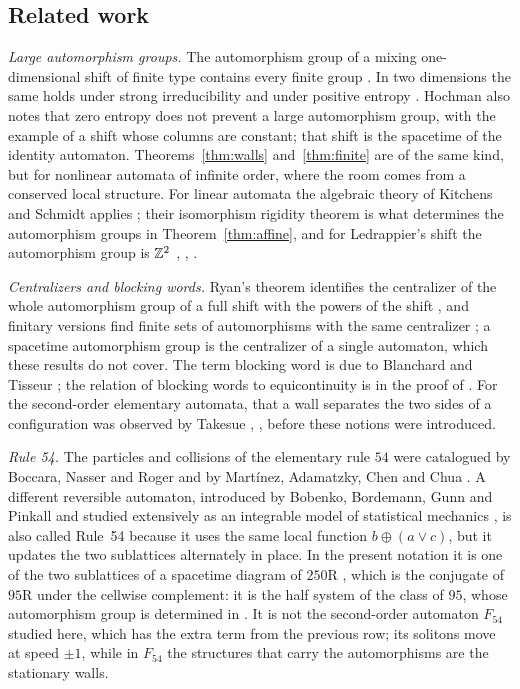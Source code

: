 \subsection*{Related work}
\emph{Large automorphism groups.} The automorphism group of a mixing one-dimensional shift of finite type contains every finite group \cite{BLR1988}. In two dimensions the same holds under strong irreducibility \cite{Ward1994} and under positive entropy \cite{Hochman2010}. Hochman also notes that zero entropy does not prevent a large automorphism group, with the example of a shift whose columns are constant; that shift is the spacetime of the identity automaton. Theorems~\ref{thm:walls} and~\ref{thm:finite} are of the same kind, but for nonlinear automata of infinite order, where the room comes from a conserved local structure. For linear automata the algebraic theory of Kitchens and Schmidt applies \cite{KS1989}; their isomorphism rigidity theorem \cite{KS2000} is what determines the automorphism groups in Theorem~\ref{thm:affine}, and for Ledrappier's shift \cite{Ledrappier1978} the automorphism group is $\mathbb{Z}^2$ \cite{Ward1994}, \cite[Theorem~7]{BRY2018}, \cite[Example~8.20]{Schmidt2002}.

\emph{Centralizers and blocking words.} Ryan's theorem identifies the centralizer of the whole automorphism group of a full shift with the powers of the shift \cite{Ryan1972}, and finitary versions find finite sets of automorphisms with the same centralizer \cite{Salo2019Ryan,Kopra2022}; a spacetime automorphism group is the centralizer of a single automaton, which these results do not cover. The term blocking word is due to Blanchard and Tisseur \cite{BT2000}; the relation of blocking words to equicontinuity is in the proof of \cite[Theorem~3]{Kurka1997}. For the second-order elementary automata, that a wall separates the two sides of a configuration was observed by Takesue \cite{Takesue1987}, \cite[Section~4]{Takesue1989}, before these notions were introduced.

\emph{Rule 54.} The particles and collisions of the elementary rule $54$ were catalogued by Boccara, Nasser and Roger \cite{BNR1991} and by Mart\'inez, Adamatzky, Chen and Chua \cite{MAM2013}. A different reversible automaton, introduced by Bobenko, Bordemann, Gunn and Pinkall \cite{BBGP1993} and studied extensively as an integrable model of statistical mechanics \cite{BKP2021}, is also called Rule~54 because it uses the same local function $b\oplus(a\vee c)$, but it updates the two sublattices alternately in place. In the present notation it is one of the two sublattices of a spacetime diagram of $250$R \cite{BKP2021}, which is the conjugate of $95$R under the cellwise complement: it is the half system of the class of $95$, whose automorphism group is determined in \cite{PaperE}. It is not the second-order automaton $F_{54}$ studied here, which has the extra term from the previous row; its solitons move at speed $\pm1$, while in $F_{54}$ the structures that carry the automorphisms are the stationary walls.

